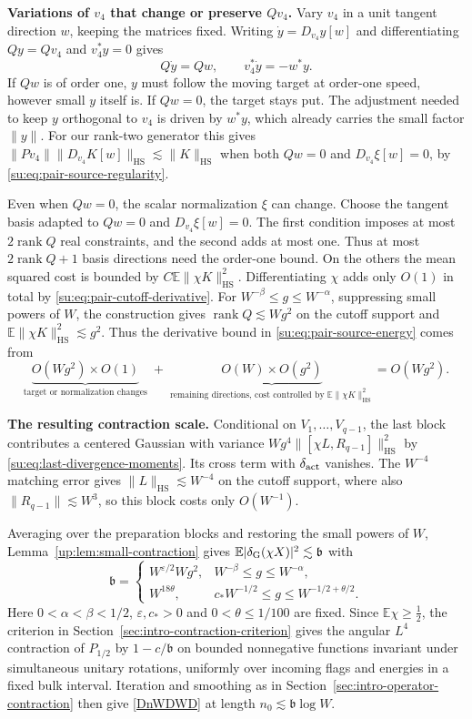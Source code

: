 \documentclass[11pt]{article}
\numberwithin{equation}{section}
\theoremstyle{remark}
\newcommand{\E}{\mathbb E}
\newcommand{\rank}{\operatorname{rank}}
\newcommand{\HS}{\mathrm{HS}}
\begin{document}
\textbf{Variations of $v_4$ that change or preserve $Qv_4$.}
Vary $v_4$ in a unit tangent direction $w$, keeping the matrices fixed.
Writing $\dot y=D_{v_4}y[w]$ and differentiating $Qy=Qv_4$ and $v_4^*y=0$ gives
\[
 Q\dot y=Qw,\qquad v_4^*\dot y=-w^*y.
\]
If $Qw$ is of order one, $y$ must follow the moving target at order-one
speed, however small $y$ itself is. If $Qw=0$, the target stays put.
The adjustment needed to keep $y$ orthogonal to $v_4$ is driven by
$w^*y$, which already carries the small factor $\|y\|$. For our rank-two
generator this gives $\|Pv_4\|\|D_{v_4}K[w]\|_{\HS}\lesssim\|K\|_{\HS}$
when both $Qw=0$ and $D_{v_4}\xi[w]=0$, by \eqref{su:eq:pair-source-regularity}.

Even when $Qw=0$, the scalar normalization $\xi$ can change.
Choose the tangent basis adapted to $Qw=0$ and $D_{v_4}\xi[w]=0$.
The first condition imposes at most $2\rank Q$ real constraints,
and the second adds at most one. Thus at most $2\rank Q+1$ basis directions
need the order-one bound. On the others the mean squared cost is bounded
by $C\E\|\chi K\|_{\HS}^2$. Differentiating $\chi$ adds only $O(1)$
in total by \eqref{su:eq:pair-cutoff-derivative}. For $W^{-\beta}\le g\le W^{-\alpha}$,
suppressing small powers of $W$, the construction gives
$\rank Q\lesssim Wg^2$ on the cutoff support and $\E\|\chi K\|_{\HS}^2\lesssim g^2$.
Thus the derivative bound in \eqref{su:eq:pair-source-energy} comes from
\[
 \underbrace{O(Wg^2)\times O(1)}_{\text{target or normalization changes}}
 \;+\;
 \underbrace{O(W)\times O(g^2)}_{\text{remaining directions, cost controlled by }\E\|\chi K\|_{\HS}^2}
 =O(Wg^2).
\]

\textbf{The resulting contraction scale.}
Conditional on $V_1,\ldots,V_{q-1}$, the last block contributes a
centered Gaussian with variance $Wg^4\|[\chi L,R_{q-1}]\|_{\HS}^2$
by \eqref{su:eq:last-divergence-moments}. Its cross term with
$\delta_{\rm act}$ vanishes. The $W^{-4}$ matching error gives
$\|L\|_{\HS}\lesssim W^{-4}$ on the cutoff support, where also
$\|R_{q-1}\|\lesssim W^3$, so this block costs only $O(W^{-1})$.

Averaging over the preparation blocks and restoring the small powers of
$W$, Lemma~\ref{up:lem:small-contraction} gives
$\E|\delta_{\rm G}(\chi X)|^2\lesssim\mathfrak b$ with
\[
 \mathfrak b=
 \begin{cases}
 W^{\varepsilon/2}Wg^2,& W^{-\beta}\le g\le W^{-\alpha},\\
 W^{18\theta},& c_*W^{-1/2}\le g\le W^{-1/2+\theta/2}.
 \end{cases}
\]
Here $0<\alpha<\beta<1/2$, $\varepsilon,c_*>0$ and $0<\theta\le1/100$
are fixed. Since $\E\chi\ge\tfrac12$, the criterion in
Section~\ref{sec:intro-contraction-criterion} gives the angular $L^4$
contraction of $P_{1/2}$ by $1-c/\mathfrak b$ on bounded nonnegative
functions invariant under simultaneous unitary rotations, uniformly
over incoming flags and energies in a fixed bulk interval. Iteration and smoothing as in
Section~\ref{sec:intro-operator-contraction} then give \eqref{DnWDWD} at length
$n_0\lesssim\mathfrak b\log W$.
\end{document}

